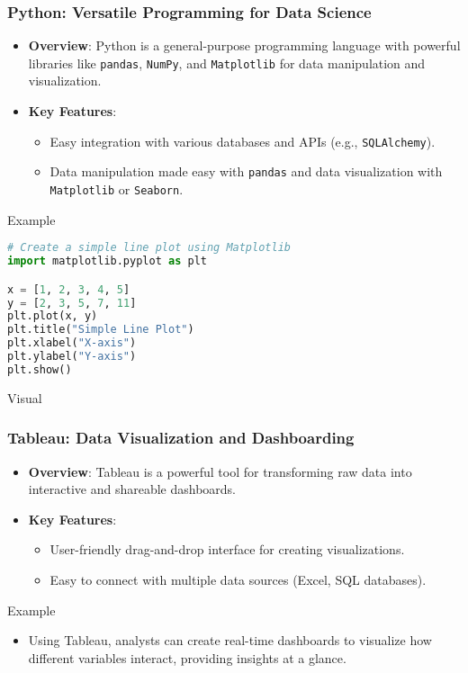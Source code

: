 \documentclass[aspectratio=169]{beamer}
\begin{document}
\begin{frame}[fragile]
    \frametitle{Python: Versatile Programming for Data Science}
    \begin{itemize}
        \item \textbf{Overview}: Python is a general-purpose programming language with powerful libraries like \texttt{pandas}, \texttt{NumPy}, and \texttt{Matplotlib} for data manipulation and visualization.
        \item \textbf{Key Features}:
        \begin{itemize}
            \item Easy integration with various databases and APIs (e.g., \texttt{SQLAlchemy}).
            \item Data manipulation made easy with \texttt{pandas} and data visualization with \texttt{Matplotlib} or \texttt{Seaborn}.
        \end{itemize}
    \end{itemize}
    \begin{block}{Example}
        \begin{lstlisting}[language=Python]
# Create a simple line plot using Matplotlib
import matplotlib.pyplot as plt

x = [1, 2, 3, 4, 5]
y = [2, 3, 5, 7, 11]
plt.plot(x, y)
plt.title("Simple Line Plot")
plt.xlabel("X-axis")
plt.ylabel("Y-axis")
plt.show()
        \end{lstlisting}
    \end{block}
    \begin{block}{Visual}
    \end{block}
\end{frame}

\begin{frame}[fragile]
    \frametitle{Tableau: Data Visualization and Dashboarding}
    \begin{itemize}
        \item \textbf{Overview}: Tableau is a powerful tool for transforming raw data into interactive and shareable dashboards.
        \item \textbf{Key Features}:
        \begin{itemize}
            \item User-friendly drag-and-drop interface for creating visualizations.
            \item Easy to connect with multiple data sources (Excel, SQL databases).
        \end{itemize}
    \end{itemize}
    \begin{block}{Example}
        \begin{itemize}
            \item Using Tableau, analysts can create real-time dashboards to visualize how different variables interact, providing insights at a glance.
        \end{itemize}
    \end{block}
\end{frame}
\end{document}
